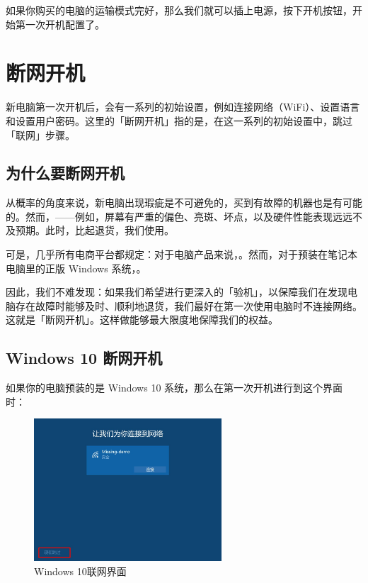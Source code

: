 如果你购买的电脑的运输模式完好，那么我们就可以插上电源，按下开机按钮，开始第一次开机配置了。

\section{断网开机}

新电脑第一次开机后，会有一系列的初始设置，例如连接网络（WiFi）、设置语言和设置用户密码。这里的「断网开机」指的是，在这一系列的初始设置中，跳过「联网」步骤。

\subsection{为什么要断网开机}

从概率的角度来说，新电脑出现瑕疵是不可避免的，买到有故障的机器也是有可能的。然而，——例如，屏幕有严重的偏色、亮斑、坏点，以及硬件性能表现远远不及预期。此时，比起退货，我们使用。

可是，几乎所有电商平台都规定：对于电脑产品来说，。然而，对于预装在笔记本电脑里的正版 Windows 系统，。

因此，我们不难发现：如果我们希望进行更深入的「验机」，以保障我们在发现电脑存在故障时能够及时、顺利地退货，我们最好在第一次使用电脑时不连接网络。这就是「断网开机」。这样做能够最大限度地保障我们的权益。

\subsection{Windows 10 断网开机}

如果你的电脑预装的是 Windows 10 系统，那么在第一次开机进行到这个界面时：

\begin{figure}[htb!]
  \centering
  \includegraphics[width=7cm]{assets/Skip_Wifi.jpg}
  \caption{Windows 10联网界面}
  \label{win-10-skip-wifi}
\end{figure}

